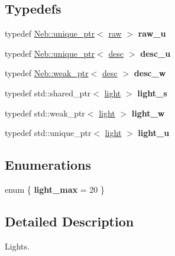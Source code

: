 \subsection*{\-Typedefs}
\begin{DoxyCompactItemize}
\item 
\hypertarget{namespaceNeb_1_1light_a05ce5347f953dde605ebae143df94885}{typedef \hyperlink{classNeb_1_1unique__ptr}{\-Neb\-::unique\-\_\-ptr}$<$ \hyperlink{classNeb_1_1light_1_1raw}{raw} $>$ {\bfseries raw\-\_\-u}}\label{namespaceNeb_1_1light_a05ce5347f953dde605ebae143df94885}

\item 
\hypertarget{namespaceNeb_1_1light_adbbeda86f286b51b1267c4c6cc519b1a}{typedef \hyperlink{classNeb_1_1unique__ptr}{\-Neb\-::unique\-\_\-ptr}$<$ \hyperlink{classNeb_1_1light_1_1desc}{desc} $>$ {\bfseries desc\-\_\-u}}\label{namespaceNeb_1_1light_adbbeda86f286b51b1267c4c6cc519b1a}

\item 
\hypertarget{namespaceNeb_1_1light_a6e582f3de614bc17c9184483a3e68bf0}{typedef \hyperlink{classNeb_1_1weak__ptr}{\-Neb\-::weak\-\_\-ptr}$<$ \hyperlink{classNeb_1_1light_1_1desc}{desc} $>$ {\bfseries desc\-\_\-w}}\label{namespaceNeb_1_1light_a6e582f3de614bc17c9184483a3e68bf0}

\item 
\hypertarget{namespaceNeb_1_1light_a30d94be9c0285562e4a7ebde657478f6}{typedef std\-::shared\-\_\-ptr$<$ \hyperlink{classNeb_1_1light_1_1light}{light} $>$ {\bfseries light\-\_\-s}}\label{namespaceNeb_1_1light_a30d94be9c0285562e4a7ebde657478f6}

\item 
\hypertarget{namespaceNeb_1_1light_a37a7c7ce4158392e2cd791d0dab827d3}{typedef std\-::weak\-\_\-ptr$<$ \hyperlink{classNeb_1_1light_1_1light}{light} $>$ {\bfseries light\-\_\-w}}\label{namespaceNeb_1_1light_a37a7c7ce4158392e2cd791d0dab827d3}

\item 
\hypertarget{namespaceNeb_1_1light_a555fef0435a4c72fefcb3e9269307fe5}{typedef std\-::unique\-\_\-ptr$<$ \hyperlink{classNeb_1_1light_1_1light}{light} $>$ {\bfseries light\-\_\-u}}\label{namespaceNeb_1_1light_a555fef0435a4c72fefcb3e9269307fe5}

\end{DoxyCompactItemize}
\subsection*{\-Enumerations}
\begin{DoxyCompactItemize}
\item 
enum \{ {\bfseries light\-\_\-max} =  20
 \}
\end{DoxyCompactItemize}


\subsection{\-Detailed \-Description}
\-Lights. 